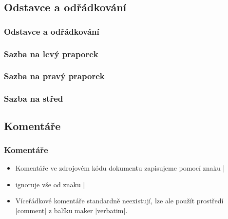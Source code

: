 \subsection{Odstavce a odřádkování}
\begin{frame}
	\frametitle{Odstavce a odřádkování}
\end{frame}


\begin{frame}
	\frametitle{Sazba na levý praporek}
	\bigskip
\end{frame}


\begin{frame}
	\frametitle{Sazba na pravý praporek}
	\bigskip
\end{frame}


\begin{frame}
	\frametitle{Sazba na střed}
	\centering
	\bigskip
\end{frame}


\subsection{Komentáře}
\begin{frame}[fragile]
	\frametitle{Komentáře}
	\begin{itemize}
		\item Komentáře ve zdrojovém kódu dokumentu zapisujeme pomocí znaku |%
		\item {} ignoruje vše od znaku |%
		\item Víceřádkové komentáře standardně neexistují, lze ale použít prostředí |comment| z balíku maker |verbatim|.
	\end{itemize}
	\medskip
	\medskip
\end{frame}


